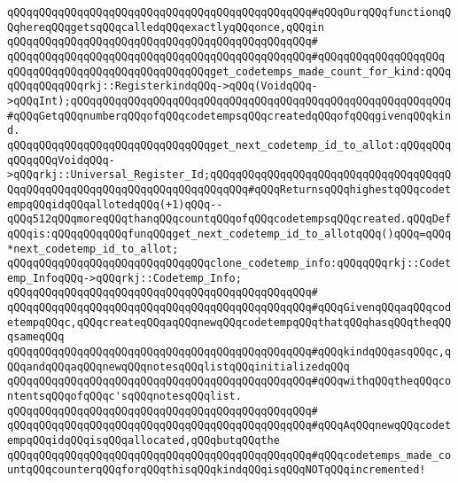 \verb|qQQqqQQqqQQqqQQqqQQqqQQqqQQqqQQqqQQqqQQqqQQqqQQq#qQQqOurqQQqfunctionqQQqhereqQQqgetsqQQqcalledqQQqexactlyqQQqonce,qQQqin|\newline
\verb|qQQqqQQqqQQqqQQqqQQqqQQqqQQqqQQqqQQqqQQqqQQqqQQq#|\newline
\verb|qQQqqQQqqQQqqQQqqQQqqQQqqQQqqQQqqQQqqQQqqQQqqQQq#qQQqqQQqqQQqqQQqqQQq|\newline
\newline
\verb|qQQqqQQqqQQqqQQqqQQqqQQqqQQqqQQqget_codetemps_made_count_for_kind:qQQqqQQqqQQqqQQqrkj::RegisterkindqQQq->qQQq(VoidqQQq->qQQqInt);qQQqqQQqqQQqqQQqqQQqqQQqqQQqqQQqqQQqqQQqqQQqqQQqqQQqqQQqqQQq#qQQqGetqQQqnumberqQQqofqQQqcodetempsqQQqcreatedqQQqofqQQqgivenqQQqkind.|\newline
\newline
\verb|qQQqqQQqqQQqqQQqqQQqqQQqqQQqqQQqget_next_codetemp_id_to_allot:qQQqqQQqqQQqqQQqVoidqQQq->qQQqrkj::Universal_Register_Id;qQQqqQQqqQQqqQQqqQQqqQQqqQQqqQQqqQQqqQQqqQQqqQQqqQQqqQQqqQQqqQQqqQQqqQQqqQQq#qQQqReturnsqQQqhighestqQQqcodetempqQQqidqQQqallotedqQQq(+1)qQQq--qQQq512qQQqmoreqQQqthanqQQqcountqQQqofqQQqcodetempsqQQqcreated.qQQqDefqQQqis:qQQqqQQqqQQqfunqQQqget_next_codetemp_id_to_allotqQQq()qQQq=qQQq*next_codetemp_id_to_allot;|\newline
\newline
\verb|qQQqqQQqqQQqqQQqqQQqqQQqqQQqqQQqclone_codetemp_info:qQQqqQQqrkj::Codetemp_InfoqQQq->qQQqrkj::Codetemp_Info;|\newline
\verb|qQQqqQQqqQQqqQQqqQQqqQQqqQQqqQQqqQQqqQQqqQQqqQQq#|\newline
\verb|qQQqqQQqqQQqqQQqqQQqqQQqqQQqqQQqqQQqqQQqqQQqqQQq#qQQqGivenqQQqaqQQqcodetempqQQqc,qQQqcreateqQQqaqQQqnewqQQqcodetempqQQqthatqQQqhasqQQqtheqQQqsameqQQq|\newline
\verb|qQQqqQQqqQQqqQQqqQQqqQQqqQQqqQQqqQQqqQQqqQQqqQQq#qQQqkindqQQqasqQQqc,qQQqandqQQqaqQQqnewqQQqnotesqQQqlistqQQqinitializedqQQq|\newline
\verb|qQQqqQQqqQQqqQQqqQQqqQQqqQQqqQQqqQQqqQQqqQQqqQQq#qQQqwithqQQqtheqQQqcontentsqQQqofqQQqc'sqQQqnotesqQQqlist.|\newline
\verb|qQQqqQQqqQQqqQQqqQQqqQQqqQQqqQQqqQQqqQQqqQQqqQQq#|\newline
\verb|qQQqqQQqqQQqqQQqqQQqqQQqqQQqqQQqqQQqqQQqqQQqqQQq#qQQqAqQQqnewqQQqcodetempqQQqidqQQqisqQQqallocated,qQQqbutqQQqthe|\newline
\verb|qQQqqQQqqQQqqQQqqQQqqQQqqQQqqQQqqQQqqQQqqQQqqQQq#qQQqcodetemps_made_countqQQqcounterqQQqforqQQqthisqQQqkindqQQqisqQQqNOTqQQqincremented!|\newline
